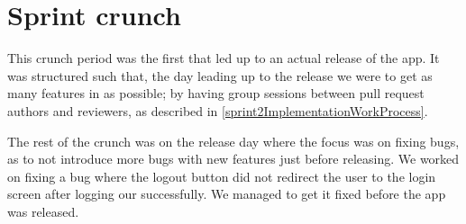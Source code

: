 \section{Sprint crunch}
This crunch period was the first that led up to an actual release of the app.
It was structured such that, the day leading up to the release we were to get as many features in as possible; by having group sessions between pull request authors and reviewers, as described in \autoref{sprint2ImplementationWorkProcess}.

The rest of the crunch was on the release day where the focus was on fixing bugs, as to not introduce more bugs with new features just before releasing. 
We worked on fixing a bug where the logout button did not redirect the user to the login screen after logging our successfully.
We managed to get it fixed before the app was released.
